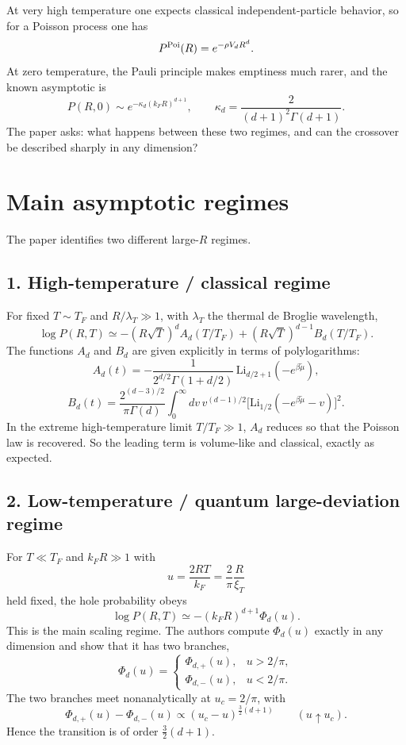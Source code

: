 \documentclass[11pt]{article}
\begin{document}
At very high temperature one expects classical independent-particle behavior, so for a Poisson process one has
\[
P^{\rm Poi}(R)=e^{-\rho V_d R^d}.
\]
At zero temperature, the Pauli principle makes emptiness much rarer, and the known asymptotic is
\[
P(R,0)\sim e^{-\kappa_d (k_F R)^{d+1}},
\qquad
\kappa_d=\frac{2}{(d+1)^2\Gamma(d+1)}.
\]
The paper asks: what happens between these two regimes, and can the crossover be described sharply in any dimension?

\section*{Main asymptotic regimes}
The paper identifies two different large-$R$ regimes.

\subsection*{1. High-temperature / classical regime}
For fixed $T\sim T_F$ and $R/\lambda_T\gg1$, with $\lambda_T$ the thermal de Broglie wavelength,
\[
\log P(R,T)\simeq -(R\sqrt T)^d A_d(T/T_F) + (R\sqrt T)^{d-1} B_d(T/T_F).
\]
The functions $A_d$ and $B_d$ are given explicitly in terms of polylogarithms:
\[
A_d(t)= -\frac{1}{2^{d/2}\Gamma(1+d/2)}\,\mathrm{Li}_{d/2+1}(-e^{\beta\tilde\mu}),
\]
\[
B_d(t)= \frac{2^{(d-3)/2}}{\pi\Gamma(d)}\int_0^{\infty} dv\, v^{(d-1)/2}
\big[\mathrm{Li}_{1/2}(-e^{\beta\tilde\mu}-v)\big]^2.
\]
In the extreme high-temperature limit $T/T_F\gg1$, $A_d$ reduces so that the Poisson law is recovered. So the leading term is volume-like and classical, exactly as expected.

\subsection*{2. Low-temperature / quantum large-deviation regime}
For $T\ll T_F$ and $k_F R\gg1$ with
\[
u = \frac{2RT}{k_F}=\frac{2}{\pi}\frac{R}{\xi_T}
\]
held fixed, the hole probability obeys
\[
\log P(R,T)\simeq -(k_F R)^{d+1}\Phi_d(u).
\]
This is the main scaling regime. The authors compute $\Phi_d(u)$ exactly in any dimension and show that it has two branches,
\[
\Phi_d(u)=
\begin{cases}
\Phi_{d,+}(u), & u>2/\pi,\\
\Phi_{d,-}(u), & u<2/\pi.
\end{cases}
\]
The two branches meet nonanalytically at $u_c=2/\pi$, with
\[
\Phi_{d,+}(u)-\Phi_{d,-}(u)\propto (u_c-u)^{\frac32(d+1)}
\qquad (u\uparrow u_c).
\]
Hence the transition is of order $\frac32(d+1)$.
\end{document}
